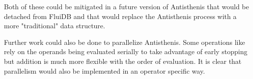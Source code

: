 Both of these could be mitigated in a future version of Antisthenis
that would be detached from FluiDB and that would replace the
Antisthenis process with a more "traditional" data structure.

Further work could also be done to parallelize Antisthenis. Some
operations like  rely on the operands being evaluated
serially to take advantage of early stopping but addition is much more
flexible with the order of evaluation. It is clear that parallelism
would also be implemented in an operator specific way.
